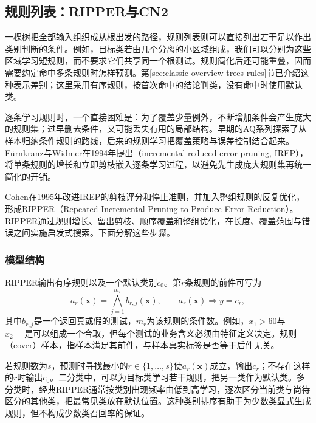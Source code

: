\subsection{规则列表：RIPPER与CN2}
\label{sec:classification-rules}
\label{sec:classification-ripper}

一棵树把全部输入组织成从根出发的路径，规则列表则可以直接列出若干足以作出类别判断的条件。例如，目标类若由几个分离的小区域组成，我们可以分别为这些区域学习短规则，而不要求它们共享同一个根测试。规则简化后还可能重叠，因而需要约定命中多条规则时怎样预测。第\ref{sec:classic-overview-trees-rules}节已介绍这种表示差别；这里采用有序规则，按首次命中的结论判类，没有命中时使用默认类。

逐条学习规则时，一个直接困难是：为了覆盖少量例外，不断增加条件会产生庞大的规则集；过早删去条件，又可能丢失有用的局部结构。早期的AQ系列探索了从样本归纳条件规则的路线，后来的规则学习把覆盖策略与误差控制结合起来。Fürnkranz与Widmer在1994年提出（incremental reduced error pruning, IREP），将单条规则的增长和立即剪枝嵌入逐条学习过程，以避免先生成庞大规则集再统一简化的开销。

Cohen在1995年改进IREP的剪枝评分和停止准则，并加入整组规则的反复优化，形成RIPPER（Repeated Incremental Pruning to Produce Error Reduction）。RIPPER通过规则增长、留出剪枝、顺序覆盖和整组优化，在长度、覆盖范围与错误之间实施启发式搜索。下面分解这些步骤。

\subsubsection{模型结构}
\label{sec:classification-ripper-structure}

RIPPER输出有序规则以及一个默认类别$c_0$。第$r$条规则的前件可写为
\begin{equation}
  a_r(\bm{x})=\bigwedge_{j=1}^{m_r}b_{r,j}(\bm{x}),
  \qquad a_r(\bm{x})\Longrightarrow y=c_r,
  \label{eq:classification-rule-form}
\end{equation}
其中$b_{r,j}$是一个返回真或假的测试，$m_r$为该规则的条件数。例如，$x_1>60$与$x_2=\text{是}$可以组成一个合取，但每个测试的业务含义必须由特征定义决定。规则（cover）样本，指样本满足其前件，与样本真实标签是否等于后件无关。

若规则数为$s$，预测时寻找最小的$r\in\{1,\ldots,s\}$使$a_r(\bm{x})$成立，输出$c_r$；不存在这样的$r$时输出$c_0$。二分类中，可以为目标类学习若干规则，把另一类作为默认类。多分类时，经典RIPPER通常按类别出现频率由低到高学习，逐次区分当前类与尚待区分的其他类，把最常见类放在默认位置。这种类别排序有助于为少数类显式生成规则，但不构成少数类召回率的保证。

